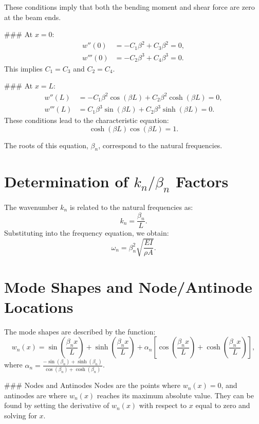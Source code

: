 \documentclass[12pt,a4paper]{article}
\begin{document}
These conditions imply that both the bending moment and shear force are zero at the beam ends.

### At \( x = 0 \):
\[
\begin{aligned}
    w''(0) &= -C_1 \beta^2 + C_3 \beta^2 = 0, \\
    w'''(0) &= -C_2 \beta^3 + C_4 \beta^3 = 0.
\end{aligned}
\]
This implies \( C_1 = C_3 \) and \( C_2 = C_4 \).

### At \( x = L \):
\[
\begin{aligned}
    w''(L) &= -C_1 \beta^2 \cos(\beta L) + C_2 \beta^2 \cosh(\beta L) = 0, \\
    w'''(L) &= C_1 \beta^3 \sin(\beta L) + C_2 \beta^3 \sinh(\beta L) = 0.
\end{aligned}
\]
These conditions lead to the characteristic equation:
\begin{equation}
    \cosh(\beta L) \cos(\beta L) = 1.
\end{equation}

The roots of this equation, \( \beta_n \), correspond to the natural frequencies.

\section{Determination of \( k_n/\beta_n \) Factors}
The wavenumber \( k_n \) is related to the natural frequencies as:
\begin{equation}
    k_n = \frac{\beta_n}{L}.
\end{equation}
Substituting into the frequency equation, we obtain:
\begin{equation}
    \omega_n = \beta_n^2 \sqrt{\frac{EI}{\rho A}}.
\end{equation}

\section{Mode Shapes and Node/Antinode Locations}
The mode shapes are described by the function:
\begin{equation}
    w_n(x) = \sin\left(\frac{\beta_n x}{L}\right) + \sinh\left(\frac{\beta_n x}{L}\right) + \alpha_n \left[ \cos\left(\frac{\beta_n x}{L}\right) + \cosh\left(\frac{\beta_n x}{L}\right) \right],
\end{equation}
where \( \alpha_n = \frac{-\sin(\beta_n) + \sinh(\beta_n)}{\cos(\beta_n) + \cosh(\beta_n)} \).

### Nodes and Antinodes
Nodes are the points where \( w_n(x) = 0 \), and antinodes are where \( w_n(x) \) reaches its maximum absolute value. They can be found by setting the derivative of \( w_n(x) \) with respect to \( x \) equal to zero and solving for \( x \).
\end{document}
